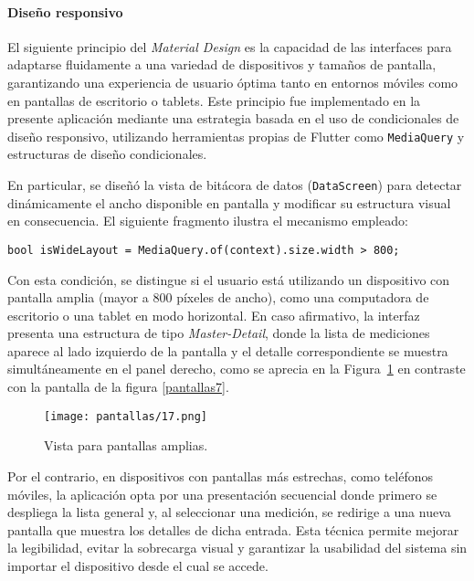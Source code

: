 \newpage
\paragraph{Diseño responsivo}


El siguiente principio del \textit{Material Design} es la capacidad de las interfaces para adaptarse fluidamente a una variedad de dispositivos y tamaños de pantalla, garantizando una experiencia de usuario óptima tanto en entornos móviles como en pantallas de escritorio o tablets. Este principio fue implementado en la presente aplicación mediante una estrategia basada en el uso de condicionales de diseño responsivo, utilizando herramientas propias de Flutter como \texttt{MediaQuery} y estructuras de diseño condicionales.

En particular, se diseñó la vista de bitácora de datos (\texttt{DataScreen}) para detectar dinámicamente el ancho disponible en pantalla y modificar su estructura visual en consecuencia. El siguiente fragmento ilustra el mecanismo empleado:

\begin{verbatim}
bool isWideLayout = MediaQuery.of(context).size.width > 800;
\end{verbatim}

Con esta condición, se distingue si el usuario está utilizando un dispositivo con pantalla amplia (mayor a 800 píxeles de ancho), como una computadora de escritorio o una tablet en modo horizontal. En caso afirmativo, la interfaz presenta una estructura de tipo \textit{Master-Detail}, donde la lista de mediciones aparece al lado izquierdo de la pantalla y el detalle correspondiente se muestra simultáneamente en el panel derecho, como se aprecia en la Figura~\ref{pantallas17} en contraste con la pantalla de la figura \ref{pantallas7}.

\begin{figure}[H]
    \centering
    \texttt{[image: pantallas/17.png]}
    \caption{Vista para pantallas amplias.}
    \label{pantallas17}
\end{figure}

Por el contrario, en dispositivos con pantallas más estrechas, como teléfonos móviles, la aplicación opta por una presentación secuencial donde primero se despliega la lista general y, al seleccionar una medición, se redirige a una nueva pantalla que muestra los detalles de dicha entrada. Esta técnica permite mejorar la legibilidad, evitar la sobrecarga visual y garantizar la usabilidad del sistema sin importar el dispositivo desde el cual se accede.

